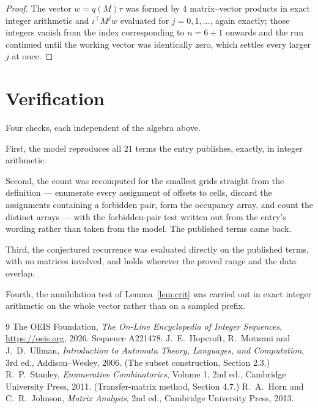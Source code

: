 \documentclass[11pt,a4paper]{article}
\theoremstyle{plain}
\theoremstyle{definition}
\begin{document}
\begin{proof}
The vector $w=q(M)\tau$ was formed by $4$ matrix--vector products in exact integer
arithmetic and $\iota^{\!\top}M^{j}w$ evaluated for $j=0,1,\dots$, again exactly; those
integers vanish from the index corresponding to $n=6+1$ onwards and the run continued
until the working vector was identically zero, which settles every larger $j$ at once.
\end{proof}

\section{Verification}

Four checks, each independent of the algebra above.

First, the model reproduces all $21$ terms the entry publishes, exactly, in integer
arithmetic.

Second, the count was recomputed for the smallest grids straight from the definition ---
enumerate every assignment of offsets to cells, discard the assignments containing a forbidden
pair, form the occupancy array, and count the distinct arrays --- with the forbidden-pair test
written out from the entry's wording rather than taken from the model. The published terms
came back.

Third, the conjectured recurrence was evaluated directly on the published terms, with no
matrices involved, and holds wherever the proved range and the data overlap.

Fourth, the annihilation test of Lemma~\ref{lem:crit} was carried out in exact integer
arithmetic on the whole vector rather than on a sampled prefix.

\begin{thebibliography}{9}
 The OEIS Foundation, \emph{The On-Line Encyclopedia of Integer
Sequences}, \url{https://oeis.org}, 2026. Sequence A221478.
 J.~E.~Hopcroft, R.~Motwani and J.~D.~Ullman, \emph{Introduction to Automata
Theory, Languages, and Computation}, 3rd ed., Addison--Wesley, 2006. (The subset
construction, Section 2.3.)
 R.~P.~Stanley, \emph{Enumerative Combinatorics}, Volume 1, 2nd ed.,
Cambridge University Press, 2011. (Transfer-matrix method, Section 4.7.)
 R.~A.~Horn and C.~R.~Johnson, \emph{Matrix Analysis}, 2nd ed., Cambridge
University Press, 2013.
\end{thebibliography}
\end{document}
